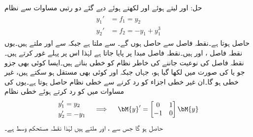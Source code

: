 حل: اور  لیتے ہوئے اور  لکھتے ہوئے دیے گئے دو رتبی مساوات سے نظام
\begin{gather}
\begin{aligned}\label{مساوات_مثال_نظام_تفرقی_سے_نظام}
y_1'&=f_1=y_2\\
y_2'&=f_2=-y_1+y_1^3
\end{aligned}
\end{gather}
 حاصل ہوتا ہے۔نقطہ فاصل  سے حاصل ہوں گے۔ سے  ملتا ہے جبکہ  سے  اور  ملتے ہیں۔یوں نقطہ فاصل ،  اور  ہیں۔نقطہ فاصل  مبدا پر پایا جاتا ہے لہٰذا اس پر پہلے غور کرتے ہیں۔نقطہ فاصل کی نوعیت جاننے کی خاطر نظام کو خطی بناتے ہیں۔ایسا کوئی بھی جزو جو  یا  کی صورت میں لکھا گیا ہو، جہاں  جبکہ  اور  کوئی بھی  مستقل ہو سکتے ہیں، غیر خطی ہو گا۔ان غیر خطی اجزاء کو رد کرنے سے خطی نظام حاصل ہوتا ہے۔یوں  کی مساوات میں  کو رد کرتے ہوئے خطی نظام 
\begin{gather*}
\begin{aligned}
y_1'&=y_2\\
y_2'&=-y_1
\end{aligned}\quad \implies \quad
\begin{aligned}
\bM{y}'=\begin{bmatrix} 0&1\\-1&0 \end{bmatrix}\bM{y}
\end{aligned}
\end{gather*}
حاصل ہو گا جس سے  ،  اور  ملتے ہیں لہٰذا نقطہ  مستحکم وسط ہے۔

